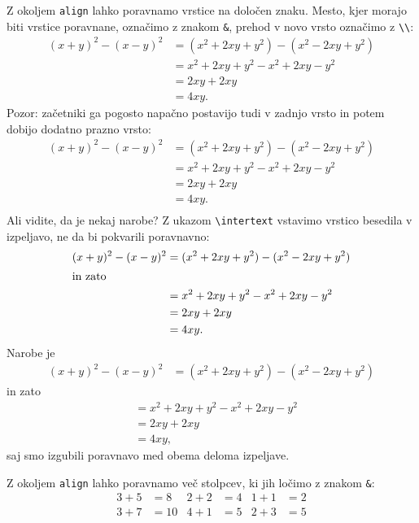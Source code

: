 \documentclass{amsart}
\begin{document}
Z okoljem \texttt{align} lahko poravnamo vrstice na določen znaku. Mesto, kjer morajo biti
vrstice poravnane, označimo z znakom \texttt{\&}, prehod v novo vrsto označimo z \verb|\\|:
%
\begin{align*}
  (x + y)^2 - (x - y)^2
  &= (x^2 + 2 x y + y^2) - (x^2 - 2 x y + y^2) \\
  &= x^2 + 2 x y + y^2 - x^2 + 2 x y - y^2 \\
  &= 2 x y + 2 x y \\
  &= 4 x y.
\end{align*}
%
Pozor: začetniki ga pogosto napačno postavijo tudi v zadnjo vrsto in potem dobijo dodatno
prazno vrsto:
%
\begin{align*}
  (x + y)^2 - (x - y)^2
  &= (x^2 + 2 x y + y^2) - (x^2 - 2 x y + y^2) \\
  &= x^2 + 2 x y + y^2 - x^2 + 2 x y - y^2 \\
  &= 2 x y + 2 x y \\
  &= 4 x y. \\
\end{align*}
%
Ali vidite, da je nekaj narobe? Z ukazom \verb|\intertext| vstavimo vrstico besedila v
izpeljavo, ne da bi pokvarili poravnavno:
%
\begin{align*}
  (x + y)^2 - (x - y)^2
  &= (x^2 + 2 x y + y^2) - (x^2 - 2 x y + y^2) \\
\intertext{in zato}
  &= x^2 + 2 x y + y^2 - x^2 + 2 x y - y^2 \\
  &= 2 x y + 2 x y \\
  &= 4 x y.
\end{align*}
%
Narobe je
%
\begin{align*}
  (x + y)^2 - (x - y)^2
  &= (x^2 + 2 x y + y^2) - (x^2 - 2 x y + y^2)
\end{align*}
%
in zato
%
\begin{align*}
  &= x^2 + 2 x y + y^2 - x^2 + 2 x y - y^2 \\
  &= 2 x y + 2 x y \\
  &= 4 x y,
\end{align*}
%
saj smo izgubili poravnavo med obema deloma izpeljave.

Z okoljem \texttt{align} lahko poravnamo več stolpcev, ki jih ločimo z znakom \texttt{\&}:
%
\begin{align*}
  3 + 5 &= 8
  &
  2 + 2 &= 4
  &
  1 + 1 &= 2
  \\
  3 + 7 &= 10
  &
  4 + 1 &= 5
  &
  2 + 3 &= 5
\end{align*}
\end{document}
